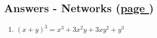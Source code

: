 \documentclass[../main.tex]{subfiles}
\begin{document}
\hypertarget{networksanswers}{\subsection*{Answers - Networks (\hyperlink{networkslink}{page \pageref{Networks}})}}

\label{Networks answers}
\begin{enumerate}
    \item \( (x+y)^3 = x^3 + 3x^2 y + 3xy^2 +y^3 \)
    
\end{enumerate}
\end{document}
